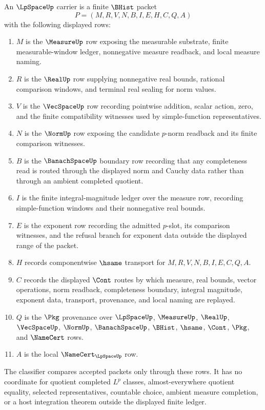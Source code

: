 \begin{definition}
\label{def:lp-space-carrier}
An $\LpSpaceUp$ carrier is a finite $\BHist$ packet
$$
P=(M,R,V,N,B,I,E,H,C,Q,A)
$$
with the following displayed rows:
\begin{enumerate}
\item $M$ is the $\MeasureUp$ row exposing the measurable substrate, finite measurable-window ledger, nonnegative measure readback, and local measure naming.
\item $R$ is the $\RealUp$ row supplying nonnegative real bounds, rational comparison windows, and terminal real sealing for norm values.
\item $V$ is the $\VecSpaceUp$ row recording pointwise addition, scalar action, zero, and the finite compatibility witnesses used by simple-function representatives.
\item $N$ is the $\NormUp$ row exposing the candidate $p$-norm readback and its finite comparison witnesses.
\item $B$ is the $\BanachSpaceUp$ boundary row recording that any completeness read is routed through the displayed norm and Cauchy data rather than through an ambient completed quotient.
\item $I$ is the finite integral-magnitude ledger over the measure row, recording simple-function windows and their nonnegative real bounds.
\item $E$ is the exponent row recording the admitted $p$-slot, its comparison witnesses, and the refusal branch for exponent data outside the displayed range of the packet.
\item $H$ records componentwise $\hsame$ transport for $M,R,V,N,B,I,E,C,Q,A$.
\item $C$ records the displayed $\Cont$ routes by which measure, real bounds, vector operations, norm readback, completeness boundary, integral magnitude, exponent data, transport, provenance, and local naming are replayed.
\item $Q$ is the $\Pkg$ provenance over $\LpSpaceUp$, $\MeasureUp$, $\RealUp$, $\VecSpaceUp$, $\NormUp$, $\BanachSpaceUp$, $\BHist$, $\hsame$, $\Cont$, $\Pkg$, and $\NameCert$ rows.
\item $A$ is the local $\NameCert_{\LpSpaceUp}$ row.
\end{enumerate}
The classifier compares accepted packets only through these rows. It has no coordinate for quotient completed $L^p$ classes, almost-everywhere quotient equality, selected representatives, countable choice, ambient measure completion, or a host integration theorem outside the displayed finite ledger.
\end{definition}

